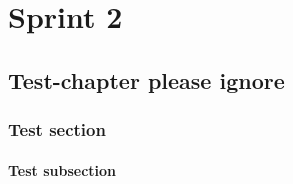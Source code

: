 \part{Sprint 2}
\chapter{Test-chapter please ignore}
\section{Test section}
\subsection{Test subsection}

